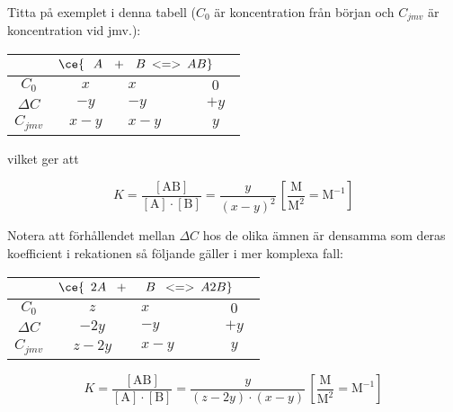 \begin{exm}
    Titta på exemplet i denna tabell ($C_0$ är koncentration från början och $C_{jmv}$ är koncentration vid jmv.):
    
    \begin{table}[H]
        \centering
        \begin{tabular}{|c|c|>{\centering\arraybackslash}m{31.5pt}|c|} 
        \cline{2-4}
        \multicolumn{1}{l|}{} & \multicolumn{3}{c|}{$\ce{\hspace{7pt} A \hspace{7pt} + \hspace{7pt} B \hspace{2pt} <=> \hspace{2pt} AB} \hspace{15pt}$}  \\ 
        \hline
        $C_0$                 & $x$   & $x$   & $0$                       \\ 
        \hline
        $\Delta C$            & $-y$  & $-y$  & $+y$                      \\ 
        \hline
        $C_{jmv}$             & $x-y$ & $x-y$ & $y$                       \\
        \hline
        \end{tabular}
    \end{table}
    
    \noindent vilket ger att
    
    \begin{equation*}
        K = \frac{[\mathrm{AB}]}{\mathrm{[A] \cdot [B]}} = \frac{y}{(x-y)^2} \, \mathrm{\left[\frac{M}{M^2}=M^{-1}\right]}
    \end{equation*}
    
    Notera att förhållendet mellan $\Delta C$ hos de olika ämnen är densamma som deras koefficient i rekationen så följande gäller i mer komplexa fall:
    
    \begin{table}[H]
        \centering
        \begin{tabular}{|c|c|>{\centering\arraybackslash}m{40pt}|c|} 
        \cline{2-4}
        \multicolumn{1}{l|}{} & \multicolumn{3}{c|}{$\ce{\hspace{5pt} 2A \hspace{6pt} + \hspace{13pt} B \hspace{5pt} <=> \hspace{2pt} A2B} \hspace{15pt}$}  \\ 
        \hline
        $C_0$                 & $z$   & $x$   & $0$                       \\ 
        \hline
        $\Delta C$            & $-2y$  & $-y$  & $+y$                      \\ 
        \hline
        $C_{jmv}$             & $z-2y$ & $x-y$ & $y$                       \\
        \hline
        \end{tabular}
    \end{table}
    
    \begin{equation*}
        K = \frac{[\mathrm{AB}]}{\mathrm{[A] \cdot [B]}} = \frac{y}{(z-2y) \cdot (x-y)} \, \mathrm{\left[\frac{M}{M^2}=M^{-1}\right]}
    \end{equation*}
\end{exm}